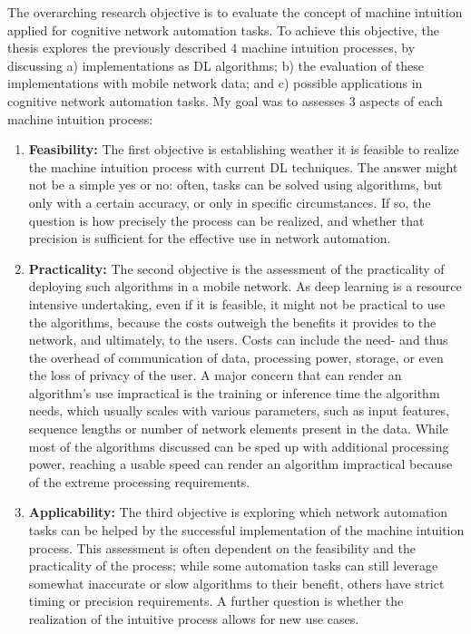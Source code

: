 			The overarching research objective is to evaluate the concept of machine intuition applied for cognitive network automation tasks.
			To achieve this objective, the thesis explores the previously described $4$ machine intuition processes, by discussing a) implementations as \ac{DL} algorithms; b) the evaluation of these implementations with mobile network data; and c) possible applications in cognitive network automation tasks.
			My goal was to assesses $3$ aspects of each machine intuition process:
			\begin{enumerate}
				\item
					\textbf{Feasibility:}
					The first objective is establishing weather it is feasible to realize the machine intuition process with current \ac{DL} techniques.
					The answer might not be a simple yes or no: often, tasks can be solved using algorithms, but only with a certain accuracy, or only in specific circumstances.
					If so, the question is how precisely the process can be realized, and whether that precision is sufficient for the effective use in network automation.
									
				\item
					\textbf{Practicality:}
					The second objective is the assessment of the practicality of deploying such algorithms in a mobile network.
					As deep learning is a resource intensive undertaking, even if it is feasible, it might not be practical to use the algorithms, because the costs outweigh the benefits it provides to the network, and ultimately, to the users.
					Costs can include the need- and thus the overhead of communication of data, processing power, storage, or even the loss of privacy of the user.
					A major concern that can render an algorithm's use impractical is the training or inference time the algorithm needs, which usually scales with various parameters, such as input features, sequence lengths or number of network elements present in the data.
					While most of the algorithms discussed can be sped up with additional processing power, reaching a usable speed can render an algorithm impractical because of the extreme processing requirements.
					
				\item
					\textbf{Applicability:}
					The third objective is exploring which network automation tasks can be helped by the successful implementation of the machine intuition process.
					This assessment is often dependent on the feasibility and the practicality of the process; while some automation tasks can still leverage somewhat inaccurate or slow algorithms to their benefit, others have strict timing or precision requirements. 
					A further question is whether the realization of the intuitive process allows for new use cases.					
			\end{enumerate}
		
